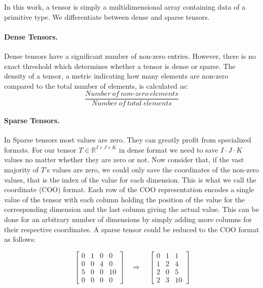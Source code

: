 \noindent
In this work, a tensor is simply a multidimensional array containing data of a
primitive type. We differentiate between dense and sparse tensors.

\paragraph{Dense Tensors.}
Dense tensors have a significant number of non-zero entries. However, there is no
exact threshold which determines whether a tensor is dense or sparse. The density
of a tensor, a metric indicating how many elements are non-zero compared to the total
number of elements, is calculated as:
\begin{equation*}
    \frac{Number\ of\ non\text{-}zero\ elements}{Number\ of\ total\ elements}
\end{equation*}

\paragraph{Sparse Tensors.}
In Sparse tensors most values are zero. They can greatly profit from specialized
formats. For our tensor $T \in \mathbb{R}^{I \times J \times K}$ in dense format
we need to save $I \cdot J \cdot K$ values no matter whether they are zero or not.
Now consider that, if the vast majority of $T$'s values are zero, we could only save
the coordinates of the non-zero values, that is the index of the value for each
dimension. This is what we call the coordinate (COO) format. Each row of the COO
representation encodes a single value of the tensor with each column holding the
position of the value for the corresponding dimension and the last column giving
the actual value. This can be done for an arbitrary number of dimensions by simply
adding more columns for their respective coordinates. A sparse tensor could be
reduced to the COO format as follows:

\begin{equation*}
    \begin{bmatrix}
        0 & 1 & 0 & 0  \\
        0 & 0 & 4 & 0  \\
        5 & 0 & 0 & 10 \\
        0 & 0 & 0 & 0
    \end{bmatrix}
    \quad
    \Rightarrow
    \quad
    \begin{bmatrix}
        0 & 1 & 1  \\
        1 & 2 & 4  \\
        2 & 0 & 5  \\
        2 & 3 & 10
    \end{bmatrix}
\end{equation*}

